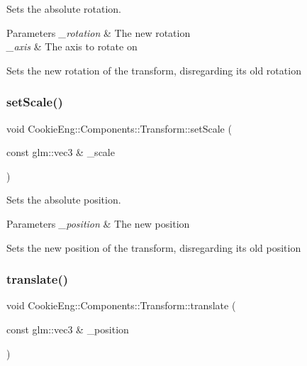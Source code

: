 Sets the absolute rotation. 


\begin{DoxyParams}{Parameters}
{\em \+\_\+rotation} & The new rotation \\
\hline
{\em \+\_\+axis} & The axis to rotate on\\
\hline
\end{DoxyParams}
Sets the new rotation of the transform, disregarding its old rotation \mbox{\label{class_cookie_eng_1_1_components_1_1_transform_a6dadfac773418cc71d538c89219af0db}} 
\subsubsection{\texorpdfstring{set\+Scale()}{setScale()}}
{\footnotesize\ttfamily void Cookie\+Eng\+::\+Components\+::\+Transform\+::set\+Scale (\begin{DoxyParamCaption}\item[{const glm\+::vec3 \&}]{\+\_\+scale }\end{DoxyParamCaption})}



Sets the absolute position. 


\begin{DoxyParams}{Parameters}
{\em \+\_\+position} & The new position\\
\hline
\end{DoxyParams}
Sets the new position of the transform, disregarding its old position \mbox{\label{class_cookie_eng_1_1_components_1_1_transform_afe2e00e8126fd92eab8c2e1a5725b2c5}} 
\subsubsection{\texorpdfstring{translate()}{translate()}}
{\footnotesize\ttfamily void Cookie\+Eng\+::\+Components\+::\+Transform\+::translate (\begin{DoxyParamCaption}\item[{const glm\+::vec3 \&}]{\+\_\+position }\end{DoxyParamCaption})}



